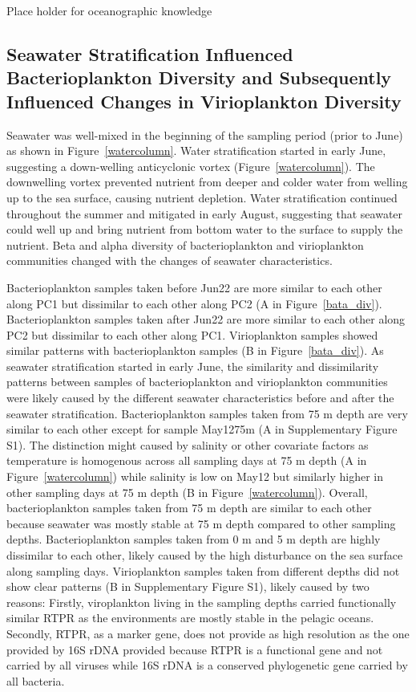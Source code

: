 \documentclass[a4,center,fleqn]{NAR}
\begin{document}
Place holder for oceanographic knowledge




\subsection{Seawater Stratification Influenced Bacterioplankton Diversity and Subsequently Influenced Changes in Virioplankton Diversity}
Seawater was well-mixed in the beginning of the sampling period (prior to June) as shown in Figure~\ref{watercolumn}.
Water stratification started in early June, suggesting a down-welling anticyclonic vortex (Figure~\ref{watercolumn}).
The downwelling vortex prevented nutrient from deeper and colder water from welling up to the sea surface, causing nutrient depletion. 
Water stratification continued throughout the summer and mitigated in early August, suggesting that seawater could well up and bring nutrient from bottom water to the surface to supply the nutrient.
Beta and alpha diversity of bacterioplankton and virioplankton communities changed with the changes of seawater characteristics.

Bacterioplankton samples taken before Jun22 are more similar to each other along PC1 but dissimilar to each other along PC2 (A in Figure~\ref{bata_div}). 
Bacterioplankton samples taken after Jun22 are more similar to each other along PC2 but dissimilar to each other along PC1.
Virioplankton samples showed similar patterns with bacterioplankton samples (B in Figure~\ref{bata_div}).
As seawater stratification started in early June, the similarity and dissimilarity patterns between samples of bacterioplankton and virioplankton communities were likely caused by the different seawater characteristics before and after the seawater stratification.
Bacterioplankton samples taken from 75 m depth are very similar to each other except for sample May12\textunderscore75m (A in Supplementary Figure S1). 
The distinction might caused by salinity or other covariate factors as temperature is homogenous across all sampling days at 75 m depth (A in Figure~\ref{watercolumn}) while salinity is low on May12 but similarly higher in other sampling days at 75 m depth (B in Figure~\ref{watercolumn}).
Overall, bacterioplankton samples taken from 75 m depth are similar to each other because seawater was mostly stable at 75 m depth compared to other sampling depths.
Bacterioplankton samples taken from 0 m and 5 m depth are highly dissimilar to each other, likely caused by the high disturbance on the sea surface along sampling days.
Virioplankton samples taken from different depths did not show clear patterns (B in Supplementary Figure S1), likely caused by two reasons: Firstly, viroplankton living in the sampling depths carried functionally similar RTPR as the environments are mostly stable in the pelagic oceans.
Secondly, RTPR, as a marker gene, does not provide as high resolution as the one provided by 16S rDNA provided because RTPR is a functional gene and not carried  by all viruses while 16S rDNA is a conserved phylogenetic gene carried by all bacteria.
\end{document}
